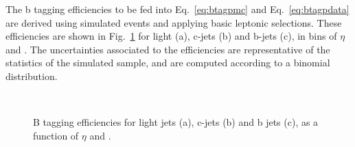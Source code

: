 The b tagging efficiencies to be fed into Eq.~\ref{eq:btagpmc} and
Eq.~\ref{eq:btagpdata} are derived using \ttbar simulated events and applying basic leptonic
selections. These efficiencies are shown in Fig.~\ref{fig:effmc} for light
(a), c-jets (b) and b-jets (c), in bins of $\eta$ and \pt. The uncertainties associated to the efficiencies are representative of the statistics of the simulated \ttbar sample, and are computed according to a binomial distribution.
\begin{figure}[!h]
\centering
{}
\\
\caption{B tagging efficiencies for light jets (a), c-jets (b) and
b jets (c), as a function of $\eta$ and \pt.\label{fig:effmc}}
\end{figure}


